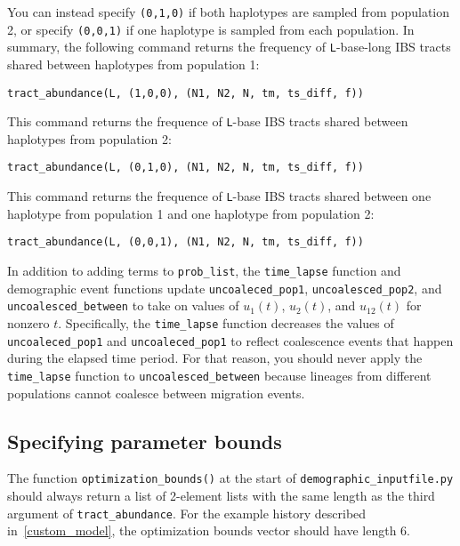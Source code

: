 \documentclass[12pt]{article}
\begin{document}
You can instead specify \verb|(0,1,0)| if both haplotypes are sampled from population 2, or specify \verb|(0,0,1)| if one haplotype is sampled from each population. In summary, the following command returns the frequency of \texttt{L}-base-long IBS tracts shared between haplotypes from population 1:

\begin{verbatim}
tract_abundance(L, (1,0,0), (N1, N2, N, tm, ts_diff, f))
\end{verbatim}

This command returns the frequence of \texttt{L}-base IBS tracts shared between haplotypes from population 2:

\begin{verbatim}
tract_abundance(L, (0,1,0), (N1, N2, N, tm, ts_diff, f))
\end{verbatim}

This command returns the frequence of \texttt{L}-base IBS tracts shared between one haplotype from population 1 and one haplotype from population 2:

\begin{verbatim}
tract_abundance(L, (0,0,1), (N1, N2, N, tm, ts_diff, f))
\end{verbatim}

In addition to adding terms to \verb|prob_list|, the \verb|time_lapse| function and demographic event functions update \verb|uncoaleced_pop1|, \verb|uncoalesced_pop2|, and \verb|uncoalesced_between| to take on values of $u_1(t)$, $u_2(t)$, and $u_{12}(t)$ for nonzero $t$. Specifically, the  \verb|time_lapse| function decreases the values of  \verb|uncoaleced_pop1| and \verb|uncoaleced_pop1| to reflect coalescence events that happen during the elapsed time period. For that reason, you should never apply the \verb|time_lapse| function to \verb|uncoalesced_between| because lineages from different populations cannot coalesce between migration events.

\subsection{Specifying parameter bounds}

The function \verb|optimization_bounds()| at the start of \verb|demographic_inputfile.py| should always return a list of 2-element lists with the same length as the third argument of \verb|tract_abundance|. For the example history described in~\ref{custom_model}, the optimization bounds vector should have length 6. 
\end{document}
